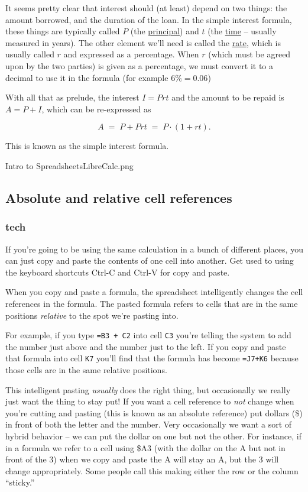 It seems pretty clear that interest should (at least) depend on two things:  the amount borrowed, and the duration of the loan.  In the simple interest formula, these things are typically called $P$ (the \underline{principal}) and $t$ (the \underline{time} -- usually measured in years).  The other element we'll need is called the \underline{rate}, which 
is usually called $r$ and expressed as a percentage.  When $r$ (which must be agreed upon by the two parties) is given as a percentage, we must convert it to a decimal to use it in the formula (for example $6\%  = 0.06$) 

With all that as prelude, the interest $I = Prt$ and the amount to be repaid is $A = P + I$, which can be re-expressed as 

\[ A \; = \; P + Prt \; = \; P \cdot (1 + rt). \]

\noindent This is known as the simple interest formula.

\clearpage
\begin{worksheet}{11}{Intro to Spreadsheets}{LibreCalc.png}

\end{worksheet}
\clearpage


\subsection{Absolute and relative cell references}

\subsubsection{tech}

If you're going to be using the same calculation in a bunch of different places, you can just copy and paste the contents of one cell into another.  Get used to using the keyboard shortcuts Ctrl-C and Ctrl-V for copy and paste.  

When you copy and paste a formula, the spreadsheet intelligently changes the cell references in the formula.  The pasted formula refers to cells that are in the same positions {\em relative} to the spot we're pasting into.  

For example, if you type {\tt =B3 + C2}  into cell {\tt C3} you're telling the system to add the number just above and the number just to the left.  If you copy and paste that formula into cell {\tt K7} you'll find that the formula has become {\tt =J7+K6} because those cells are in the same relative positions.

This intelligent pasting {\em usually} does the right thing, but occasionally we really just want the thing to stay put!  If you want a cell reference to {\em not} change when you're cutting and pasting (this is known as an absolute reference) put dollars (\$) in front of both the letter and the number.  Very occasionally we want a sort of hybrid behavior -- we can put the dollar on one but not the other.  For instance, if in a formula we refer to a cell using \$A3  (with the dollar on the A but not in front of the 3) when we copy and paste the A will stay an A, but the 3 will change appropriately.  Some people call this making either the row or the column ``sticky.''  

